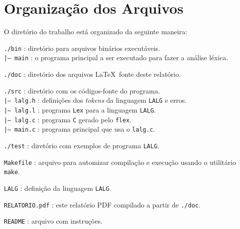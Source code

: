 \newpage
\section{Organização dos Arquivos \label{sec:organizacao-dos-arquivos}}

O diretório do trabalho está organizado da seguinte maneira:

\indent\indent\texttt{./bin} : diretório para arquivos binários executáveis.\\
\indent\indent\indent\texttt{|-- main} : o programa principal a ser executado para fazer a análise léxica.

\indent\indent\texttt{./doc} : diretório dos arquivos \LaTeX~fonte deste relatório.

\indent\indent\texttt{./src} : diretório com os códigos-fonte do programa.\\
\indent\indent\indent\texttt{|-- \texttt{lalg}.h} : definições dos \textit{tokens} da linguagem \texttt{LALG} e erros.\\
\indent\indent\indent\texttt{|-- \texttt{lalg}.l} : programa \texttt{Lex} para a linguagem \texttt{LALG}.\\
\indent\indent\indent\texttt{|-- \texttt{lalg}.c} : programa \texttt{C} gerado pelo \texttt{flex}.\\
\indent\indent\indent\texttt{|-- main.c} : programa principal que usa o \texttt{\texttt{lalg}.c}.

\indent\indent\texttt{./test} : diretório com exemplos de programa \texttt{LALG}.

\indent\indent\texttt{Makefile} : arquivo para automizar compilação e execução usando o utilitário \texttt{make}.

\indent\indent\texttt{\texttt{LALG}} : definição da linguagem \texttt{LALG}.

\indent\indent\texttt{RELATORIO.pdf} : este relatório PDF compilado a partir de \texttt{./doc}.

\indent\indent\texttt{README} : arquivo com instruções.

